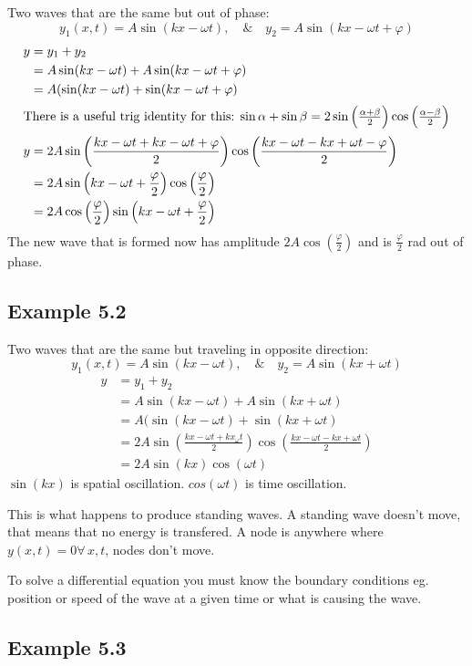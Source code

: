 \documentclass{article}
\newcommand{\A}{\forall\,}
\begin{document}
Two waves that are the same but out of phase:
\[y_1(x,t)=A\sin(kx-\omega t),\quad\&\quad y_2=A\sin(kx-\omega t+\varphi)\]
\begin{align*}
y&=y_1+y_2\\
&=A\sin(kx-\omega t)+A\sin(kx-\omega t+\varphi)\\
&=A(\sin(kx-\omega t)+\sin(kx-\omega t+\varphi)\\
\intertext{There is a useful trig identity for this: \(\sin\alpha+\sin\beta=2\sin\left(\frac{\alpha+\beta}{2}\right)\cos\left(\frac{\alpha-\beta}{2}\right)\)}
y&=2A\sin\left(\frac{kx-\omega t+kx-\omega t+\varphi}{2}\right)\cos\left(\frac{kx-\omega t-kx+\omega t-\varphi}{2}\right)\\
&=2A\sin\left(kx-\omega t+\frac{\varphi}{2}\right)\cos\left(\frac{\varphi}{2}\right)\\
&=2A\cos\left(\frac{\varphi}{2}\right)\sin\left(kx-\omega t+\frac{\varphi}{2}\right)
\end{align*}
The new wave that is formed now has amplitude \(2A\cos\left(\frac{\varphi}{2}\right)\) and is \(\frac{\varphi}{2}\) \si{rad} out of phase.

\subsection*{Example 5.2}

Two waves that are the same but traveling in opposite direction:
\[y_1(x,t)=A\sin(kx-\omega t),\quad\&\quad y_2=A\sin(kx+\omega t)\]
\begin{align*}
y&=y_1+y_2\\
&=A\sin(kx-\omega t)+A\sin(kx+\omega t)\\
&=A(\sin(kx-\omega t)+\sin(kx+\omega t)\\
&=2A\sin\left(\frac{kx-\omega t+kx_\omega t}{2}\right)\cos\left(\frac{kx-\omega t-kx+\omega t}{2}\right)\\
&=2A\sin(kx)\cos(\omega t)
\end{align*}
\(\sin(kx)\) is spatial oscillation. \(cos(\omega t)\) is time oscillation.

This is what happens to produce standing waves. A standing wave doesn't move, that means that no energy is transfered. A node is anywhere where \(y(x,t)=0\A x,t\), nodes don't move.

To solve a differential equation you must know the boundary conditions eg. position or speed of the wave at a given time or what is causing the wave. 

\subsection*{Example 5.3}
\end{document}
